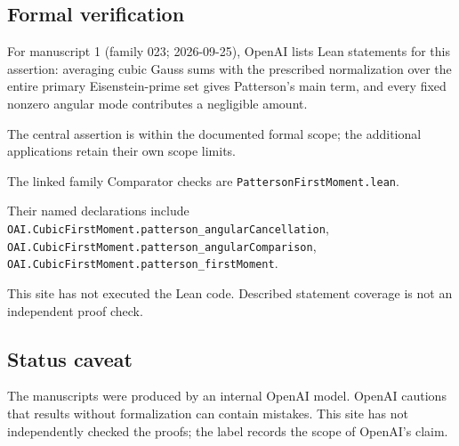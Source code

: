 \documentclass[11pt]{article}
\begin{document}
\subsection{Formal verification}
For manuscript 1 (family 023; 2026-09-25), OpenAI lists Lean statements for this assertion: averaging cubic Gauss sums with the prescribed normalization over the entire primary Eisenstein-prime set gives Patterson's main term, and every fixed nonzero angular mode contributes a negligible amount.

The central assertion is within the documented formal scope; the additional applications retain their own scope limits.

The linked family Comparator checks are \texttt{PattersonFirstMoment.lean}.

Their named declarations include \texttt{OAI.CubicFirstMoment.patterson\_angularCancellation}, \texttt{OAI.CubicFirstMoment.patterson\_angularComparison}, \texttt{OAI.CubicFirstMoment.patterson\_firstMoment}.

This site has not executed the Lean code. Described statement coverage is not an independent proof check.

\subsection{Status caveat}
The manuscripts were produced by an internal OpenAI model. OpenAI cautions that results without formalization can contain mistakes. This site has not independently checked the proofs; the label records the scope of OpenAI's claim.
\end{document}

